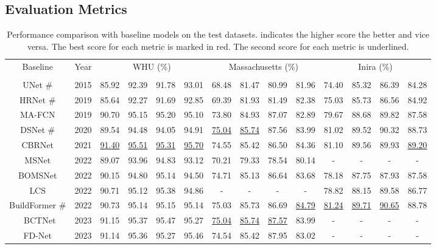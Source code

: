 \documentclass[lettersize,journal]{IEEEtran}
\begin{document}
\subsection{Evaluation Metrics}
\begin{table*}[]
\normalsize
\setlength\tabcolsep{3pt}
\caption{Performance comparison with baseline models on the test datasets.  indicates the higher score the better and vice versa. The best score for each metric is marked in red. The second score for each metric is underlined.}
\label{tab:table_test}
\center
\begin{tabular}{c|c|cccc|cccc|cccc}
\hline
\multirow{2}{*}{Baseline}& \multirow{2}{*}{Year} & \multicolumn{4}{c|}{WHU (\%)}&\multicolumn{4}{c|}{Massachusetts (\%)} &\multicolumn{4}{c}{Inira (\%)}                                             
 \\ \cline{3-14} 
 & &  &  &  &  
 &  &  &  & 
 &  &  &  &  \\ \hline
UNet \#& 2015 &
85.92 &92.39 &91.78 &93.01
&68.48	&81.47 &80.99	&81.96
&74.40	&85.32	&86.39	&84.28 \\
HRNet \#& 2019 &
85.64 &92.27 &91.69 &92.85
&69.39	&81.93	&81.49	&82.38
&75.03 &85.73 &86.56 &84.92\\ 
MA-FCN & 2019 &
90.70 &95.15 &95.20 &95.10
&73.80	&84.93	&87.07	&82.89
&79.67	&88.68	&89.82	&87.58 \\ 
DSNet \#& 2020 &
89.54 &94.48 &94.05 &94.91
&\underline{75.04}	&\underline{85.74}	&87.56	&83.99
&81.02	&89.52	&90.32	&88.73\\
CBRNet& 2021 &
\underline{91.40} &\underline{95.51} &\underline{95.31} &{\underline{95.70}}
&74.55	&85.42	&86.50	&84.36 
&81.10	&89.56	&89.93	&\underline{89.20}\\ 
MSNet & 2022 &
89.07 &93.96 &94.83 &93.12
&70.21	&79.33	&78.54	&80.14
& - &- &- &-\\ 
BOMSNet& 2022 &
90.15 &94.80 &95.14 &94.50
&74.71  &85.13	&86.64	&83.68
&78.18	&87.75	&87.93	&87.58\\ 
LCS & 2022 &
90.71 &95.12 &95.38 &94.86 
&- &- &- &-
&78.82	&88.15	&89.58	&86.77 \\
BuildFormer \#& 2022 &
90.73 &95.14 &{95.15} &95.14 
&75.03	&85.73	&86.69	&\underline{84.79}
&\underline{81.24}	&\underline{89.71}	&\underline{90.65}	&88.78
\\\
BCTNet & 2023 &
91.15 &95.37 &95.47 &95.27
&\underline{75.04} &\underline{85.74} &\underline{87.57} &83.99
&- & -&- &- \\
FD-Net &2023 &
91.14 & 95.36 & 95.27 &95.46
&74.54 &85.42 &87.95 &83.02
&- &- &- &- \\ \hline






\end{tabular}
\end{table*}
\end{document}
